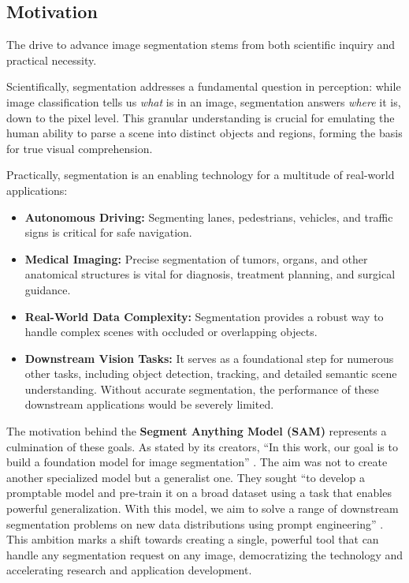 \documentclass[conference]{IEEEtran}
\begin{document}
\subsection{Motivation}
The drive to advance image segmentation stems from both scientific inquiry and practical necessity.

Scientifically, segmentation addresses a fundamental question in perception: while image classification tells us \textit{what} is in an image, segmentation answers \textit{where} it is, down to the pixel level. This granular understanding is crucial for emulating the human ability to parse a scene into distinct objects and regions, forming the basis for true visual comprehension.

Practically, segmentation is an enabling technology for a multitude of real-world applications:
\begin{itemize}
	\item \textbf{Autonomous Driving:} Segmenting lanes, pedestrians, vehicles, and traffic signs is critical for safe navigation.
	\item \textbf{Medical Imaging:} Precise segmentation of tumors, organs, and other anatomical structures is vital for diagnosis, treatment planning, and surgical guidance.
	\item \textbf{Real-World Data Complexity:} Segmentation provides a robust way to handle complex scenes with occluded or overlapping objects.
	\item \textbf{Downstream Vision Tasks:} It serves as a foundational step for numerous other tasks, including object detection, tracking, and detailed semantic scene understanding. Without accurate segmentation, the performance of these downstream applications would be severely limited.
\end{itemize}

The motivation behind the \textbf{Segment Anything Model (SAM)} represents a culmination of these goals. As stated by its creators, ``In this work, our goal is to build a foundation model for image segmentation'' \cite{kirillov2023segment}. The aim was not to create another specialized model but a generalist one. They sought ``to develop a promptable model and pre-train it on a broad dataset using a task that enables powerful generalization. With this model, we aim to solve a range of downstream segmentation problems on new data distributions using prompt engineering'' \cite{kirillov2023segment}. This ambition marks a shift towards creating a single, powerful tool that can handle any segmentation request on any image, democratizing the technology and accelerating research and application development.
\end{document}
